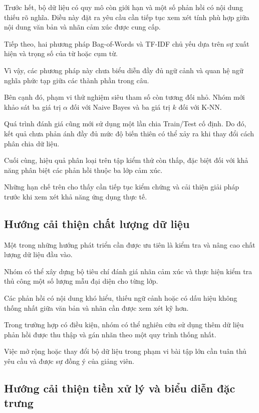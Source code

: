 Trước hết, bộ dữ liệu có quy mô còn giới hạn
và một số phản hồi có nội dung thiếu rõ
nghĩa. Điều này đặt ra yêu cầu cần tiếp tục
xem xét tính phù hợp giữa nội dung văn bản
và nhãn cảm xúc được cung cấp.

Tiếp theo, hai phương pháp Bag-of-Words
và TF-IDF chủ yếu dựa trên sự xuất hiện
và trọng số của từ hoặc cụm từ.

Vì vậy, các phương pháp này chưa biểu diễn
đầy đủ ngữ cảnh và quan hệ ngữ nghĩa phức
tạp giữa các thành phần trong câu.

Bên cạnh đó, phạm vi thử nghiệm siêu tham
số còn tương đối nhỏ. Nhóm mới khảo sát
ba giá trị $\alpha$ đối với Naive Bayes
và ba giá trị $k$ đối với K-NN.

Quá trình đánh giá cũng mới sử dụng
một lần chia Train/Test cố định.
Do đó, kết quả chưa phản ánh đầy đủ
mức độ biến thiên có thể xảy ra
khi thay đổi cách phân chia dữ liệu.

Cuối cùng, hiệu quả phân loại trên tập
kiểm thử còn thấp, đặc biệt đối với
khả năng phân biệt các phản hồi
thuộc ba lớp cảm xúc.

Những hạn chế trên cho thấy cần
tiếp tục kiểm chứng và cải thiện
giải pháp trước khi xem xét
khả năng ứng dụng thực tế.


\subsection{Hướng cải thiện chất lượng dữ liệu}

Một trong những hướng phát triển cần
được ưu tiên là kiểm tra và nâng cao
chất lượng dữ liệu đầu vào.

Nhóm có thể xây dựng bộ tiêu chí
đánh giá nhãn cảm xúc và thực hiện
kiểm tra thủ công một số lượng mẫu
đại diện cho từng lớp.

Các phản hồi có nội dung khó hiểu,
thiếu ngữ cảnh hoặc có dấu hiệu
không thống nhất giữa văn bản
và nhãn cần được xem xét kỹ hơn.

Trong trường hợp có điều kiện,
nhóm có thể nghiên cứu sử dụng
thêm dữ liệu phản hồi được thu
thập và gán nhãn theo một quy
trình thống nhất.

Việc mở rộng hoặc thay đổi bộ
dữ liệu trong phạm vi bài tập lớn
cần tuân thủ yêu cầu và được sự
đồng ý của giảng viên.


\subsection{Hướng cải thiện tiền xử lý và biểu diễn đặc trưng}

